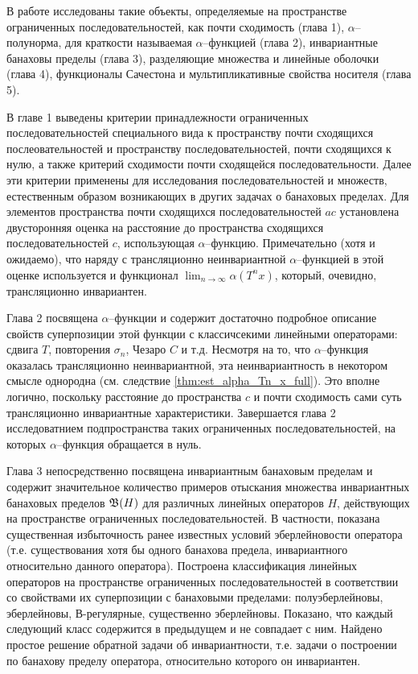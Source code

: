 В работе исследованы такие объекты, определяемые на пространстве ограниченных последовательностей,
как почти сходимость (глава 1), $\alpha$--полунорма, для краткости называемая $\alpha$--функцией (глава 2),
инвариантные банаховы пределы (глава 3), разделяющие множества и линейные оболочки (глава 4),
функционалы Сачестона и мультипликативные свойства носителя (глава 5).

В главе 1 выведены критерии принадлежности ограниченных последовательностей
специального вида к пространству почти сходящихся послеовательностей
и пространству последовательностей, почти сходящихся к нулю,
а также критерий сходимости почти сходящейся последовательности.
Далее эти критерии применены для исследования последовательностей и множеств,
естественным образом возникающих в других задачах о банаховых пределах.
Для элементов пространства почти сходящихся последовательностей $ac $
установлена двусторонняя оценка на расстояние до пространства сходящихся последовательностей $c$,
использующая $\alpha$--функцию.
Примечательно (хотя и ожидаемо), что наряду с трансляционно неинвариантной $\alpha$--функцией
в этой оценке используется и функционал $\lim_{n\to\infty}\alpha(T^n x)$,
который, очевидно, трансляционно инвариантен.

Глава 2 посвящена $\alpha$--функции и содержит достаточно подробное описание
свойств суперпозиции этой функции с классичсекими линейными операторами:
сдвига $T$, повторения $\sigma_n$, Чезаро $C$ и т.д.
Несмотря на то, что $\alpha$--функция оказалась трансляционно неинвариантной,
эта неинвариантность в некотором смысле однородна (см. следствие \ref{thm:est_alpha_Tn_x_full}).
Это вполне логично, поскольку расстояние до пространства $c$ и почти сходимость
сами суть трансляционно инвариантные характеристики.
Завершается глава 2 исследоватнием подпространства таких ограниченных последовательностей,
на которых $\alpha$--функция обращается в нуль.

Глава 3 непосредственно посвящена инвариантным банаховым пределам и содержит
значительное количество примеров отыскания множества инвариантных банаховых пределов $\mathfrak{B}(H)$
для различных линейных операторов $H$, действующих на пространстве ограниченных последовательностей.
В частности, показана существенная избыточность ранее известных условий эберлейновости оператора
(т.е. существования хотя бы одного банахова предела, инвариантного относительно данного оператора).
Построена классификация линейных операторов на пространстве ограниченных последовательностей
в соответствии со свойствами их суперпозиции с банаховыми пределами:
полуэберлейновы, эберлейновы, В-регулярные, существенно эберлейновы.
Показано, что каждый следующий класс содержится в предыдущем и не совпадает с ним.
Найдено простое решение обратной задачи об инвариантности,
т.е. задачи о построении по банахову пределу оператора, относительно которого он инвариантен.

